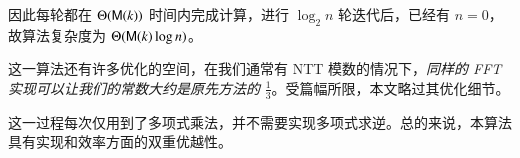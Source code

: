 因此每轮都在 $\Theta(\mathsf M(k))$ 时间内完成计算，进行 $\log_2 n$ 轮迭代后，已经有 $n=0$，故算法复杂度为 $\Theta(\mathsf M(k)\log n)$。

这一算法还有许多优化的空间，在我们通常有 NTT 模数的情况下，\emph{同样的 FFT 实现可以让我们的常数大约是原先方法的} $\frac {1}{3}$。受篇幅所限，本文略过其优化细节。

这一过程每次仅用到了多项式乘法，并不需要实现多项式求逆。总的来说，本算法具有实现和效率方面的双重优越性。








